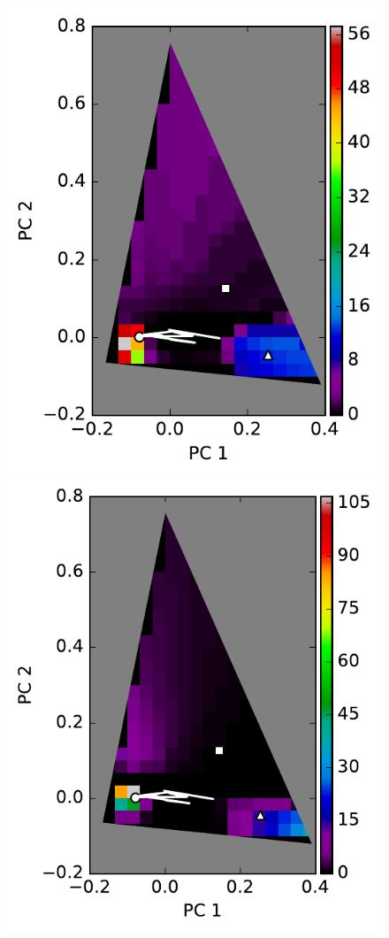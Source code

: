 \documentclass[iop,numberedappendix,apj,]{emulateapj}
\begin{document}
\begin{figure}[tbh!]
    \begin{center}
\includegraphics[width=\hsize]{IGBP_lon_noreg.pdf}
\includegraphics[width=\hsize]{IGBP_lon_reg_l30deg.pdf}

\end{center}
\end{figure}
\end{document}
